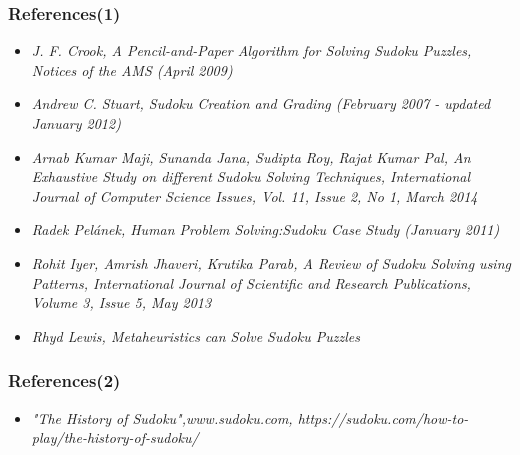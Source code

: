 \documentclass[xcolor=dvipsnames, 11pt]{beamer}
\begin{document}
	\begin{frame}
	\frametitle{References(1)}
	\begin{itemize}
		\item \textit{J. F. Crook, A Pencil-and-Paper Algorithm for Solving Sudoku Puzzles, Notices of the AMS (April 2009)}
		\item \textit{Andrew C. Stuart, Sudoku Creation and Grading (February 2007 - updated January 2012)}
		\item \textit{Arnab Kumar Maji, Sunanda Jana, Sudipta Roy, Rajat Kumar Pal, An Exhaustive Study on different Sudoku Solving Techniques, International Journal of Computer Science Issues, Vol. 11, Issue 2, No 1, March 2014}
		\item \textit{Radek Pelánek, Human Problem Solving:Sudoku Case Study (January 2011)}
		\item \textit{Rohit Iyer, Amrish Jhaveri, Krutika Parab, A Review of Sudoku Solving using Patterns, International Journal of Scientific and Research Publications, Volume 3, Issue 5, May 2013}
		\item \textit{Rhyd Lewis, Metaheuristics can Solve Sudoku Puzzles}
	\end{itemize}
\end{frame}

	\begin{frame}
	\frametitle{References(2)}
	\begin{itemize}
		\item \textit{"The History of Sudoku",www.sudoku.com, https://sudoku.com/how-to-play/the-history-of-sudoku/}
	\end{itemize}
\end{frame}
\end{document}
